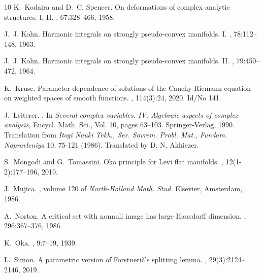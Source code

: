 \documentclass[11pt]{amsart}
\numberwithin{equation}{section}
\theoremstyle{definition}
\begin{document}
\begin{thebibliography}{10}
K.~Kodaira and D.~C. Spencer.
\newblock On deformations of complex analytic structures. {I}, {II}.
, 67:328--466, 1958.

J.~J. Kohn.
\newblock Harmonic integrals on strongly pseudo-convex manifolds. {I}.
, 78:112--148, 1963.

J.~J. Kohn.
\newblock Harmonic integrals on strongly pseudo-convex manifolds. {II}.
, 79:450--472, 1964.

K.~Kruse.
\newblock Parameter dependence of solutions of the {Cauchy}-{Riemann} equation
  on weighted spaces of smooth functions.
, 114(3):24, 2020.
\newblock Id/No 141.

J.~{Leiterer}.
.
\newblock In {\em Several complex variables. IV. Algebraic aspects of complex
  analysis}, Encycl. Math. Sci., Vol. 10, pages 63--103. Springer-Verlag, 1990.
\newblock Translation from {\em Itogi Nauki Tekh., Ser. Sovrem. Probl. Mat.,
  Fundam. Napravleniya} 10, 75-121 (1986). Translated by D. N. Akhiezer.

S.~Mongodi and G.~Tomassini.
\newblock Oka principle for {Levi} flat manifolds.
, 12(1-2):177--196, 2019.

J.~Mujica.
, volume 120 of {\em
  North-Holland Math. Stud.}
\newblock Elsevier, Amsterdam, 1986.

A.~Norton.
\newblock A critical set with nonnull image has large {Hausdorff} dimension.
, 296:367--376, 1986.

K.~{Oka}.
, 9:7--19, 1939.

L.~Simon.
\newblock A parametric version of {F}orstneri\v{c}'s splitting lemma.
, 29(3):2124--2146, 2019.

\end{thebibliography}
\end{document}
